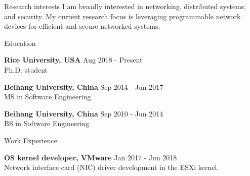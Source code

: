 \documentclass{resume} %
\begin{document}
\begin{rSection}{Research interests}
I am broadly  interested in networking, distributed systems, and security.
My current research focus is leveraging programmable network devices
for efficient and secure networked systems.
\end{rSection}


\begin{rSection}{Education}

{\bf Rice University, USA} \hfill { Aug 2018 - Present}
\\ Ph.D. student

{\bf Beihang University, China} \hfill { Sep 2014 - Jun 2017}
\\ MS in Software Engineering

{\bf Beihang University, China} \hfill { Sep 2010 - Jun 2014}
\\ BS in Software Engineering

\end{rSection}



\begin{rSection}{Work Experience}

{\bf OS kernel developer, VMware} \hfill { Jan 2017 - Jun 2018} \\
Network interface card (NIC) driver development in the ESXi kernel.


\end{rSection}
\end{document}
